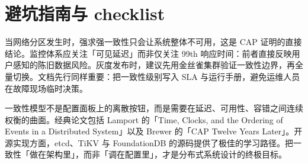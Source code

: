 \chapter{避坑指南与 checklist}
当网络分区发生时，强求强一致性只会让系统整体不可用，这是 CAP 证明的直接结论。监控体系应关注「可见延迟」而非仅关注 99th 响应时间：前者直接反映用户感知的陈旧数据风险。灰度发布时，建议先用金丝雀集群验证一致性边界，再全量切换。文档先行同样重要：把一致性级别写入 SLA 与运行手册，避免运维人员在故障现场临时决策。\par
一致性模型不是配置面板上的离散按钮，而是需要在延迟、可用性、容错之间连续权衡的曲面。经典论文包括 Lamport 的「Time, Clocks, and the Ordering of Events in a Distributed System」以及 Brewer 的「CAP Twelve Years Later」。开源实现方面，etcd、TiKV 与 FoundationDB 的源码提供了极佳的学习路径。把一致性「做在架构里」，而非「调在配置里」，才是分布式系统设计的终极目标。\par
